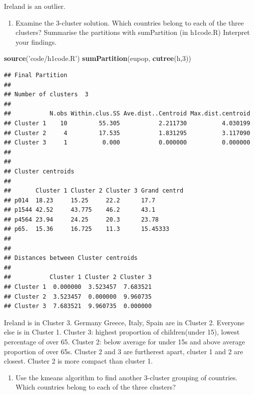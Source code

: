 \documentclass[]{article}
\newenvironment{Shaded}{\begin{snugshade}}{\end{snugshade}}
\newcommand{\DecValTok}[1]{\textcolor[rgb]{0.00,0.00,0.81}{#1}}
\newcommand{\KeywordTok}[1]{\textcolor[rgb]{0.13,0.29,0.53}{\textbf{#1}}}
\newcommand{\NormalTok}[1]{#1}
\newcommand{\StringTok}[1]{\textcolor[rgb]{0.31,0.60,0.02}{#1}}
\providecommand{\tightlist}{%
  \setlength{\itemsep}{0pt}\setlength{\parskip}{0pt}}
\begin{document}
Ireland is an outlier.

\begin{enumerate}
\def\labelenumi{\alph{enumi})}
\setcounter{enumi}{1}
\tightlist
\item
  Examine the 3-cluster solution. Which countries belong to each of the
  three clusters? Summarise the partitions with sumPartition (in
  h1code.R) Interpret your findings.
\end{enumerate}

\begin{Shaded}
\begin{Highlighting}[]
\KeywordTok{source}\NormalTok{(}\StringTok{'code/h1code.R'}\NormalTok{)}
\KeywordTok{sumPartition}\NormalTok{(eupop, }\KeywordTok{cutree}\NormalTok{(h,}\DecValTok{3}\NormalTok{))}
\end{Highlighting}
\end{Shaded}

\begin{verbatim}
## Final Partition
## 
## Number of clusters  3
## 
##           N.obs Within.clus.SS Ave.dist..Centroid Max.dist.centroid
## Cluster 1    10         55.305           2.211730          4.030199
## Cluster 2     4         17.535           1.831295          3.117090
## Cluster 3     1          0.000           0.000000          0.000000
## 
## 
## Cluster centroids
## 
##       Cluster 1 Cluster 2 Cluster 3 Grand centrd
## p014  18.23     15.25     22.2      17.7        
## p1544 42.52     43.775    46.2      43.1        
## p4564 23.94     24.25     20.3      23.78       
## p65.  15.36     16.725    11.3      15.45333    
## 
## 
## Distances between Cluster centroids
## 
##           Cluster 1 Cluster 2 Cluster 3
## Cluster 1  0.000000  3.523457  7.683521
## Cluster 2  3.523457  0.000000  9.960735
## Cluster 3  7.683521  9.960735  0.000000
\end{verbatim}

Ireland is in Cluster 3. Germany Greece, Italy, Spain are in Cluster 2.
Everyone else is in Cluster 1. Cluster 3: highest proportion of
children(under 15), lowest percentage of over 65. Cluster 2: below
average for under 15s and above average proportion of over 65s. Cluster
2 and 3 are furtherest apart, cluster 1 and 2 are closest. Cluster 2 is
more compact than cluster 1.

\begin{enumerate}
\def\labelenumi{\alph{enumi})}
\setcounter{enumi}{2}
\tightlist
\item
  Use the kmeans algorithm to find another 3-cluster grouping of
  countries. Which countries belong to each of the three clusters?
\end{enumerate}
\end{document}
